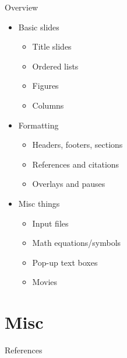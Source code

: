 \documentclass[11pt,mathserif]{beamer} %
\begin{document}
\begin{frame}[t]{Overview} %
	\begin{itemize} %
		\item Basic slides %
		\begin{itemize} %
			\item Title slides %
			\item Ordered lists
			\item Figures
			\item Columns
		\end{itemize} %
\vspace{0.1in} %
		\item Formatting %
		\begin{itemize} %
			\item Headers, footers, sections
			\item References and citations
			\item Overlays and pauses
		\end{itemize}
\vspace{0.1in}
		\item Misc things
		\begin{itemize}
			\item Input files
			\item Math equations/symbols
			\item Pop-up text boxes
			\item Movies
		\end{itemize}
	\end{itemize}
\end{frame}


\section{Misc}


\frame{\titlepage} %


\begin{frame}[allowframebreaks]{References}


\end{frame}
\end{document}

